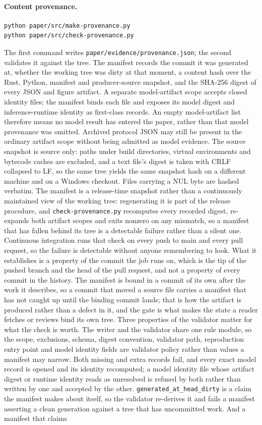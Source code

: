 \paragraph{Content provenance.}
\begin{verbatim}
python paper/src/make-provenance.py
python paper/src/check-provenance.py
\end{verbatim}
The first command writes \texttt{paper/evidence/provenance.json}; the second validates it against the tree.
The manifest records the commit it was generated at, whether the working tree was dirty at that moment, a content hash over the Rust, Python, manifest and producer-source snapshot, and the SHA-256 digest of every JSON and figure artifact. A separate model-artifact scope accepts closed identity files; the manifest binds each file and exposes its model digest and inference-runtime identity as first-class records. An empty model-artifact list therefore means no model result has entered the paper, rather than that model provenance was omitted. Archived protocol JSON may still be present in the ordinary artifact scope without being admitted as model evidence. The source snapshot is source only: paths under build directories, virtual environments and bytecode caches are excluded, and a text file's digest is taken with CRLF collapsed to LF, so the same tree yields the same snapshot hash on a different machine and on a Windows checkout. Files carrying a NUL byte are hashed verbatim. The manifest is a release-time snapshot rather than a continuously maintained view of the working tree: regenerating it is part of the release procedure, and \texttt{check-provenance.py} recomputes every recorded digest, re-expands both artifact scopes and exits nonzero on any mismatch, so a manifest that has fallen behind its tree is a detectable failure rather than a silent one. Continuous integration runs that check on every push to main and every pull request, so the failure is detectable without anyone remembering to look. What it establishes is a property of the commit the job runs on, which is the tip of the pushed branch and the head of the pull request, and not a property of every commit in the history. The manifest is bound in a commit of its own after the work it describes, so a commit that moved a source file carries a manifest that has not caught up until the binding commit lands; that is how the artifact is produced rather than a defect in it, and the gate is what makes the state a reader fetches or reviews bind its own tree. Three properties of the validator matter for what the check is worth. The writer and the validator share one rule module, so the scope, exclusions, schema, digest convention, validator path, reproduction entry point and model identity fields are validator policy rather than values a manifest may narrow. Both missing and extra records fail, and every exact model record is opened and its identity recomputed; a model identity file whose artifact digest or runtime identity reads as unresolved is refused by both rather than written by one and accepted by the other. \texttt{generated\_at\_head\_dirty} is a claim the manifest makes about itself, so the validator re-derives it and fails a manifest asserting a clean generation against a tree that has uncommitted work. And a manifest that claims 